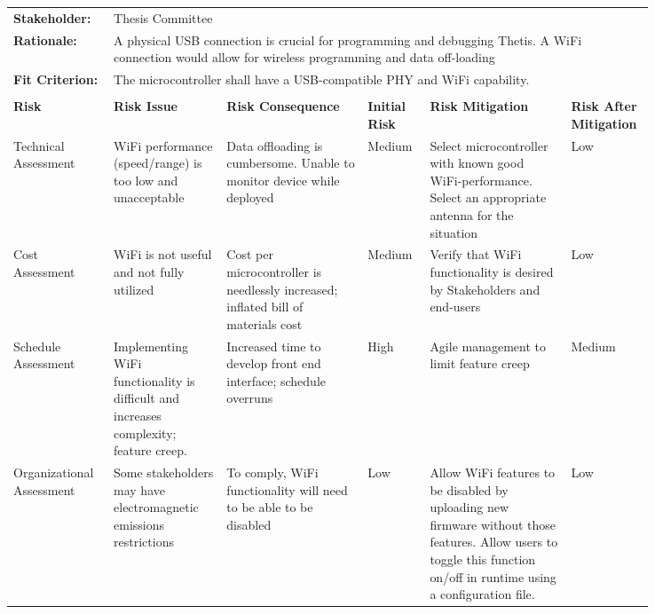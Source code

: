 \begin{landscape}
{\begin{longtable}{| p{0.12\linewidth} | p{0.16\linewidth} |  p{0.20\linewidth} | p{0.08\linewidth} | p{0.20\linewidth} | p{0.08\linewidth} |}
	\hline
	\rowcolor[gray]{0.8}
	\multicolumn{6}{|c|}{ } \\
	\hline
	\textbf{Stakeholder:} & \multicolumn{5}{|l|}{Thesis Committee} \\
	\hline
	\textbf{Rationale:} & \multicolumn{5}{|p{0.8\linewidth}|}{A physical USB connection is crucial for programming and debugging Thetis. A WiFi connection would allow for wireless programming and data off-loading} \\
	\hline
	\textbf{Fit Criterion:} & \multicolumn{5}{|p{0.8\linewidth}|}{The microcontroller shall have a USB-compatible PHY and WiFi capability.} \\
	\hline
	\rowcolor[gray]{0.8}
	\multicolumn{6}{|c|}{ } \\
	\hline
	\textbf{Risk} & \textbf{Risk Issue} & \textbf{Risk Consequence} & \textbf{Initial Risk} & \textbf{Risk Mitigation} & \textbf{Risk \newline After \newline Mitigation} \\
	\hline
	Technical \newline Assessment & WiFi performance (speed/range) is too low and unacceptable & Data offloading is cumbersome. \newline Unable to monitor device while deployed & \cellcolor{yellow} Medium & Select microcontroller with known good WiFi-performance. \newline Select an appropriate antenna for the situation & \cellcolor{green} Low \\
	\hline
	Cost \newline Assessment & WiFi is not useful and not fully utilized & Cost per microcontroller is needlessly increased; inflated bill of materials cost & \cellcolor{yellow} Medium & Verify that WiFi functionality is desired by Stakeholders and end-users & \cellcolor{green} Low \\
	\hline
	Schedule \newline Assessment & Implementing WiFi functionality is difficult and increases complexity; feature creep. & Increased time to develop front end interface; schedule overruns & \cellcolor{red} High & Agile management to limit feature creep & \cellcolor{yellow} Medium \\
	\hline
	Organizational \newline Assessment & Some stakeholders may have electromagnetic emissions restrictions & To comply, WiFi functionality will need to be able to be disabled & \cellcolor{green} Low & Allow WiFi features to be disabled by uploading new firmware without those features. \newline Allow users to toggle this function on/off in runtime using a configuration file. & \cellcolor{green} Low \\

\end{longtable}}
\end{landscape}
